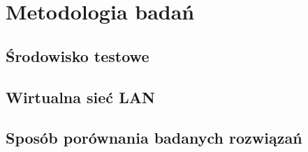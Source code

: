 \chapter[Metodologia badań.]{Metodologia badań}

\section{Środowisko testowe}

\section{Wirtualna sieć LAN}

\section{Sposób porównania badanych rozwiązań}

